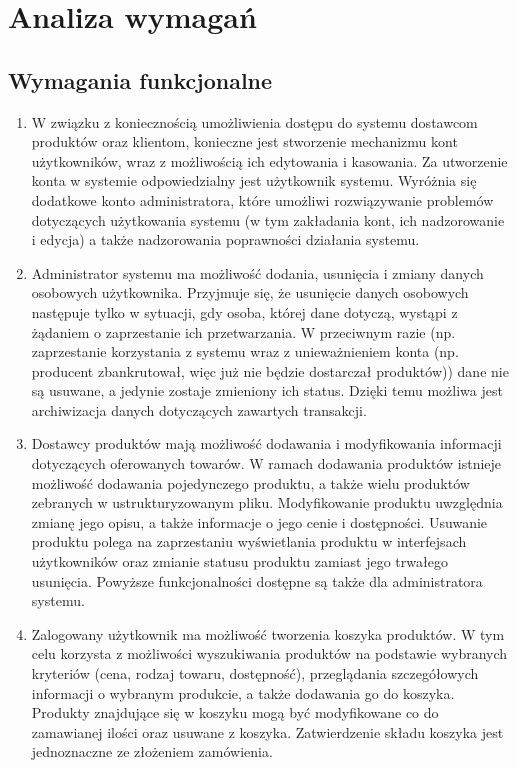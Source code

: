 \documentclass[11pt,a4paper,twoside]{article}
\begin{document}
\section{Analiza wymagań}
\subsection{Wymagania funkcjonalne}
\begin{enumerate}[start=1,label={WF\arabic*.}]
\item W związku z koniecznością umożliwienia dostępu do systemu dostawcom produktów oraz klientom, konieczne jest stworzenie mechanizmu kont użytkowników, wraz z możliwością ich edytowania i kasowania. Za utworzenie konta w systemie odpowiedzialny jest użytkownik systemu. Wyróżnia się dodatkowe konto administratora, które umożliwi rozwiązywanie problemów dotyczących użytkowania systemu (w tym zakładania kont, ich nadzorowanie i edycja) a także nadzorowania poprawności działania systemu.
\item Administrator systemu ma możliwość dodania, usunięcia i zmiany danych osobowych użytkownika. Przyjmuje się, że usunięcie danych osobowych następuje tylko w sytuacji, gdy osoba, której dane dotyczą, wystąpi z żądaniem o zaprzestanie ich przetwarzania. W przeciwnym razie (np. zaprzestanie korzystania z systemu wraz z unieważnieniem konta (np. producent zbankrutował, więc już nie będzie dostarczał produktów)) dane nie są usuwane, a jedynie zostaje zmieniony ich status. Dzięki temu możliwa jest archiwizacja danych dotyczących zawartych transakcji.
\item \label{dostawcy} Dostawcy produktów mają możliwość dodawania i modyfikowania informacji dotyczących oferowanych towarów. W ramach dodawania produktów istnieje możliwość dodawania pojedynczego produktu, a także wielu produktów zebranych w ustrukturyzowanym pliku. Modyfikowanie produktu uwzględnia  zmianę jego opisu, a także informacje o jego cenie i dostępności. Usuwanie produktu polega na zaprzestaniu wyświetlania produktu w interfejsach użytkowników oraz zmianie statusu produktu zamiast jego trwałego usunięcia. Powyższe funkcjonalności dostępne są także dla administratora systemu.
\item Zalogowany użytkownik ma możliwość tworzenia koszyka produktów. W tym celu korzysta z możliwości wyszukiwania produktów na podstawie wybranych kryteriów (cena, rodzaj towaru, dostępność), przeglądania szczegółowych informacji o wybranym produkcie, a także dodawania go do koszyka. Produkty znajdujące się w koszyku mogą być modyfikowane co do zamawianej ilości oraz usuwane z koszyka. Zatwierdzenie składu koszyka jest jednoznaczne ze złożeniem zamówienia.

\end{enumerate}
\end{document}
